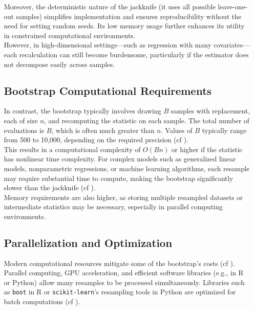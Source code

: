 \documentclass[aodsor,preprint]{imsart}
\numberwithin{equation}{section}
\theoremstyle{plain}
\begin{document}
Moreover, the deterministic nature of the jackknife (it uses all possible leave-one-out samples) simplifies implementation and ensures reproducibility without the need for setting random seeds. Its low memory usage further enhances its utility in constrained computational environments.\\

However, in high-dimensional settings—such as regression with many covariates—each recalculation can still become burdensome, particularly if the estimator does not decompose easily across samples.\\

\subsection{Bootstrap Computational Requirements}

In contrast, the bootstrap typically involves drawing $B$ samples with replacement, each of size $n$, and recomputing the statistic on each sample. The total number of evaluations is $B$, which is often much greater than $n$. Values of $B$ typically range from 500 to 10,000, depending on the required precision (cf \cite{efron1993introduction,davison1997bootstrap}).\\

This results in a computational complexity of $O(Bn)$ or higher if the statistic has nonlinear time complexity. For complex models such as generalized linear models, nonparametric regressions, or machine learning algorithms, each resample may require substantial time to compute, making the bootstrap significantly slower than the jackknife (cf \cite{davison1997bootstrap}).\\

Memory requirements are also higher, as storing multiple resampled datasets or intermediate statistics may be necessary, especially in parallel computing environments.

\subsection{Parallelization and Optimization}

Modern computational resources mitigate some of the bootstrap's costs (cf \cite{davison1997bootstrap,efron1993introduction}). Parallel computing, GPU acceleration, and efficient software libraries (e.g., in R or Python) allow many resamples to be processed simultaneously. Libraries such as \texttt{boot} in R or \texttt{scikit-learn}'s resampling tools in Python are optimized for batch computations (cf \cite{scikit-learn,rcoreteam}).\\
\end{document}
